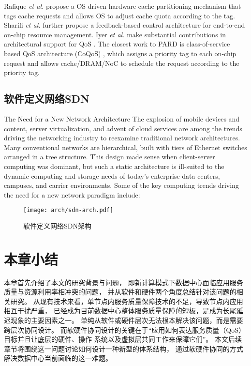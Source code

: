 Rafique \emph{et al.} \cite{Rafique:2006:ASO} propose a OS-driven hardware cache partitioning mechanism that tags
cache requests and allows OS to adjust cache quota according to the tag.
Sharifi \emph{et al.} \cite{sharifi_mete:_2011} further propose a feedback-based
 control architecture for end-to-end on-chip resource management.
Iyer \emph{et al.} make substantial contributions in architectural
support for QoS \cite{herdrich_rate-based_2009, iyer_cqos:_2004, iyer_qos_2007,li_coqos:_2011,li_dynamic_2012}.
The closest work to PARD is class-of-service based QoS architecture (CoQoS) \cite{li_dynamic_2012, li_coqos:_2011},
which assigns a priority tag to each on-chip request and allows cache/DRAM/NoC to
schedule the request according to the priority tag.




\subsection{软件定义网络SDN}
\label{sec:background:sdn}

The Need for a New Network Architecture %
The explosion of mobile devices and content, server virtualization, and
advent of cloud services are among the trends driving the networking
industry to reexamine traditional network architectures. Many conventional
networks are hierarchical, built with tiers of Ethernet switches arranged in
a tree structure. This design made sense when client-server computing
was dominant, but such a static architecture is ill-suited to the dynamic
computing and storage needs of today’s enterprise data centers,
campuses, and carrier environments. Some of the key computing trends
driving the need for a new network paradigm include:

\begin{figure}[tbh]
  \centering
  \texttt{[image: arch/sdn-arch.pdf]}
  \caption{软件定义网络SDN架构}
  \label{fig:pard-arch-outline}
\end{figure}


\section{本章小结}

本章首先介绍了本文的研究背景与问题，
即新计算模式下数据中心面临应用服务质量与资源利用率相冲突的问题，
并从软件和硬件两个角度总结针对该问题的相关研究。
从现有技术来看，单节点内服务质量保障技术的不足，导致节点内应用相互干扰严重，
已经成为目前数据中心整体服务质量保障的短板，是成为长尾延迟现象的主要因素之一。
单纯从软件或硬件层次无法根本解决该问题，而是需要跨层次协同设计。
而软硬件协同设计的关键在于``应用如何表达服务质量（QoS）目标并且让底层的硬件、操作
系统以及虚拟层共同工作来保障它们''\cite{21st_architecture}。
本文后续章节将围绕这一问题讨论如何设计一种新型的体系结构，
通过软硬件协同的方式解决数据中心当前面临的这一难题。

